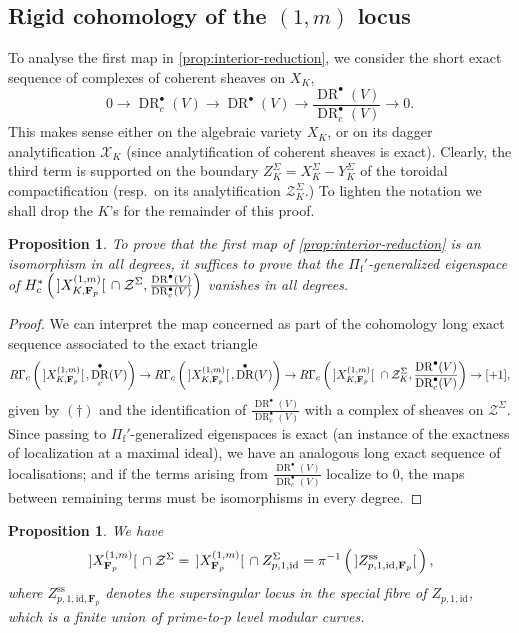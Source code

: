 \documentclass[cjm]{ipart}
\theoremstyle{plain}
\newtheorem{proposition}[theorem]{Proposition}
\theoremstyle{remark}
\DeclareMathOperator{\DR}{DR}
\DeclarePairedDelimiter{\tb}{{\,]}}{{[\, }} %
\newcommand{\Fp}{\mathbf{F}_p}
\newcommand{\Pif}{\Pi_{\mathrm{f}}}
\newcommand{\cX}{\mathcal{X}}
\numberwithin{equation}{subsection}
\begin{document}
  
 \subsection{Rigid cohomology of the $(1, m)$ locus}

  To analyse the first map in \cref{prop:interior-reduction}, we consider the short exact sequence of complexes of coherent sheaves on $X_K$,
  \[
   \tag{\dag}
   0 \to \DR^\bullet_c(V) \to \DR^\bullet(V) \to \frac{\DR^\bullet(V)}{\DR^\bullet_c(V)} \to 0.
  \]
  This makes sense either on the algebraic variety $X_K$, or on its dagger analytification $\cX_K$ (since analytification of coherent sheaves is exact). Clearly, the third term is supported on the boundary $Z_K^{\Sigma} = X_K^{\Sigma} - Y_K^{\Sigma}$ of the toroidal compactification (resp.~on its analytification $\mathcal{Z}_K^{\Sigma}$.) To lighten the notation we shall drop the $K$'s for the remainder of this proof.
  
  \begin{proposition}
   To prove that the first map of \cref{prop:interior-reduction} is an isomorphism in all degrees, it suffices to prove that the $\Pif'$-generalized eigenspace of $H^*_{c}\left(\tb{X_{K, \Fp}^{(1, m)}} \cap \mathcal{Z}^{\Sigma}, \frac{\DR^\bullet(V)}{\DR^\bullet_c(V)}\right)$ vanishes in all degrees.
  \end{proposition} 
  
  \begin{proof}
   We can interpret the map concerned as part of the cohomology long exact sequence associated to the exact triangle
   \[ 
    R\Gamma_{c}\left(\tb{X_{K, \Fp}^{(1, m)}}, \DR^\bullet_c(V)\right) \to  R\Gamma_{c}\left(\tb{X_{K, \Fp}^{(1, m)}}, \DR^\bullet(V)\right) \to
    R\Gamma_{c}\left(\tb{X_{K, \Fp}^{(1, m)}}\, \cap \mathcal{Z}_K^{\Sigma}, \frac{\DR^\bullet(V)}{\DR^\bullet_c(V)}\right)\to [+1], 
   \]
   given by $(\dag)$ and the identification of $\frac{\DR^\bullet(V)}{\DR^\bullet_c(V)}$ with a complex of sheaves on $\mathcal{Z}^\Sigma$. Since passing to $\Pif'$-generalized eigenspaces is exact (an instance of the exactness of localization at a maximal ideal), we have an analogous long exact sequence of localisations; and if the terms arising from $\frac{\DR^\bullet(V)}{\DR^\bullet_c(V)}$ localize to 0, the maps between remaining terms must be isomorphisms in every degree.
  \end{proof}
  
  \begin{proposition}
   We have
   \[ \tb{X_{\Fp}^{(1, m)}} \cap \mathcal{Z}^{\Sigma} = \tb{X_{\Fp}^{(1, m)}} \cap Z_{p, 1,\mathrm{id}}^{\Sigma} = \pi^{-1}\left(\tb{Z_{p, 1, \mathrm{id}, \Fp}^{\mathrm{ss}}}\right), \]
   where $Z_{p, 1, \mathrm{id}, \Fp}^{\mathrm{ss}}$ denotes the supersingular locus in the special fibre of $Z_{p, 1, \mathrm{id}}$, which is a finite union of prime-to-$p$ level modular curves.
  \end{proposition}
  
\end{document}
